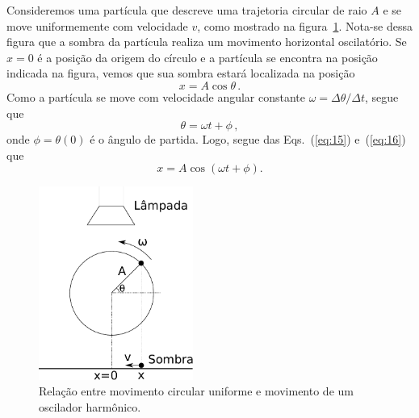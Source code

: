 \documentclass[twocolumn=on,fontsize=12pt,DIV=calc]{scrartcl}
\theoremstyle{definition}
\begin{document}
Consideremos uma partícula que descreve uma trajetoria circular de
raio $A$ e se move uniformemente com velocidade $v$, como mostrado na
figura~\ref{fig:ociladoranalogia}. Nota-se dessa figura que a sombra
da partícula realiza um movimento horizontal oscilatório. Se $x=0$ é a
posição da origem do círculo e a partícula se encontra na posição
indicada na figura, vemos que sua sombra estará localizada na posição
\begin{equation}
  \label{eq:15}
  x=A\cos\theta\,.
\end{equation}
Como a partícula se move com velocidade angular constante
$\omega=\Delta\theta/\Delta t$, segue que
\begin{equation}
  \label{eq:16}
  \theta=\omega t+\phi\,,
\end{equation}
onde $\phi=\theta(0)$ é o ângulo de partida. Logo, segue das
Eqs.~(\ref{eq:15}) e~(\ref{eq:16}) que
\begin{equation}
  \label{eq:17}
  x=A\cos(\omega t+\phi).
\end{equation}

\begin{figure}[ht]
  \centering
  \includegraphics[width=0.45\textwidth,keepaspectratio]{aux/osciladoranalogia.pdf}
  \caption{Relação entre movimento circular uniforme e movimento de um
    oscilador harmônico.}
  \label{fig:ociladoranalogia}
\end{figure}
\end{document}
